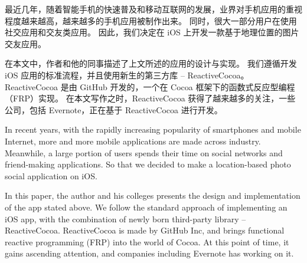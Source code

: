 \begin{cabstract}
最近几年，随着智能手机的快速普及和移动互联网的发展，业界对手机应用的重视程度越来越高，越来越多的手机应用被制作出来。
同时，很大一部分用户在使用社交应用和交友类应用。
因此，我们决定在 iOS 上开发一款基于地理位置的图片交友应用。

在本文中，作者和他的同事描述了上文所述的应用的设计与实现。
我们遵循开发 iOS 应用的标准流程，并且使用新生的第三方库 -- ReactiveCocoa。
ReactiveCocoa 是由 GitHub 开发的，一个在 Cocoa 框架下的函数式反应型编程（FRP）实现。
在本文写作之时，ReactiveCocoa 获得了越来越多的关注，一些公司，包括 Evernote，正在基于 ReactiveCocoa 进行开发。
\end{cabstract}
\begin{eabstract}
In recent years, with the rapidly increasing popularity of smartphones and mobile Internet, more and more mobile applications are made across industry. Meanwhile, a large portion of users spends their time on social networks and friend-making applications. So that we decided to make a location-based photo social application on iOS.

In this paper, the author and his colleges presents the design and implementation of the app stated above. We follow the standard approach of implementing an iOS app, with the combination of newly born third-party library -- ReactiveCocoa. ReactiveCocoa is made by GitHub Inc, and brings functional reactive programming (FRP) into the world of Cocoa. At this point of time, it gains ascending attention, and companies including Evernote has working on it.
\end{eabstract}
